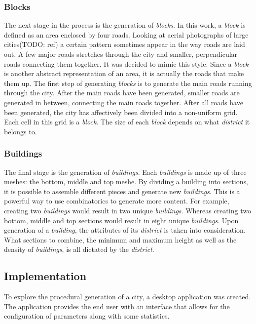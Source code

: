 		\subsubsection{Blocks}
		The next stage in the process is the generation of \textit{blocks}. In this work, a \textit{block} is defined as an area enclosed by four roads. Looking at aerial photographs of large cities(TODO: ref) a certain pattern sometimes appear in the way roads are laid out. A few major roads stretches through the city and smaller, perpendicular roads connecting them together. It was decided to mimic this style. Since a \textit{block} is another abstract representation of an area, it is actually the roads that make them up. The first step of generating \textit{blocks} is to generate the main roads running through the city. After the main roads have been generated, smaller roads are generated in between, connecting the main roads together. After all roads have been generated, the city has affectively been divided into a non-uniform grid. Each cell in this grid is a \textit{block}. The size of each \textit{block} depends on what \textit{district} it belongs to.
		
		\subsubsection{Buildings}
		The final stage is the generation of \textit{buildings}. Each \textit{buildings} is made up of three meshes: the bottom, middle and top meshe. By dividing a building into sections, it is possible to assemble different pieces and generate new \textit{buildings}. This is a powerful way to use combinatorics to generate more content. For example, creating two \textit{buildings} would result in two unique \textit{buildings}. Whereas creating two bottom, middle and top sections would result in eight unique \textit{buildings}. Upon generation of a \textit{building}, the attributes of its \textit{district} is taken into consideration. What sections to combine, the minimum and maximum height as well as the density of \textit{buildings}, is all dictated by the \textit{district}.

	\subsection{Implementation}
	To explore the procedural generation of a city, a desktop application was created. The application provides the end user with an interface that allows for the configuration of parameters along with some statistics. 
	
